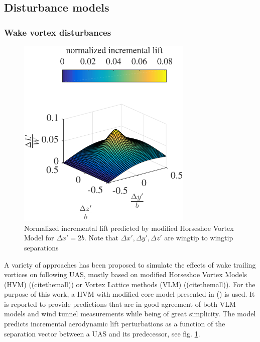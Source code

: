 \documentclass{ifacconf}
\begin{document}
\subsection{Disturbance models}

\subsubsection{Wake vortex disturbances}

\begin{figure}
\begin{center}
\includegraphics[width=8.4cm]{incrementallift}    %
\caption{Normalized incremental lift predicted by modified Horseshoe Vortex Model for $\Delta x' = 2b$. Note that $\Delta x', \Delta y', \Delta z'$ are wingtip to wingtip separations}
\label{fig:HSVMincrementalift}
\end{center}
\end{figure}

A variety of approaches has been proposed to simulate the effects of wake trailing vortices on following UAS, mostly based on modified Horseshoe Vortex Models (HVM) ((citethemall)) or Vortex Lattice methods (VLM) ((citethemall)). For the purpose of this work, a HVM with modified core model presented in (\cite{dogan2005modeling}) is used. It is reported to provide predictions that are in good agreement of both VLM models and wind tunnel measurements while being of great simplicity. The model predicts incremental aerodynamic lift perturbations as a function of the separation vector between a UAS and its predecessor, see fig. \ref{fig:HSVMincrementalift}.
\end{document}
